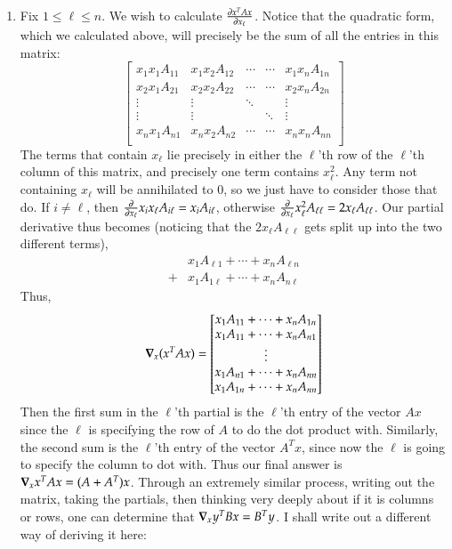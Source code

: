 \documentclass[12pt]{article}
\theoremstyle{definitionstyle}
\begin{document}
\begin{enumerate}[leftmargin=\labelsep]
\begin{enumerate}
			\item Fix $1 \leq \ell \leq n$. We wish to calculate $\pdv{x^TAx}{x_\ell}$. Notice that the quadratic form, which we calculated above, will precisely be the sum of all the entries in this matrix:
			\[
			\begin{bmatrix} 
				x_{1}x_1A_{11} & x_1x_2A_{12} & \cdots & \cdots & x_1x_nA_{1n} \\
				x_2x_1A_{21} & x_2x_2A_{22} & \cdots & \cdots & x_2x_nA_{2n} \\
				\vdots & \vdots & \ddots & & \vdots \\
				\vdots & \vdots & & \ddots & \vdots \\
				x_nx_1A_{n1} & x_nx_2A_{n2} & \cdots & \cdots & x_nx_nA_{nn} \\
			\end{bmatrix}\]
			The terms that contain $x_\ell$ lie precisely in either the $\ell$'th row of the $\ell$'th column of this matrix, and precisely one term contains $x_\ell^2$. Any term not containing $x_\ell$ will be annihilated to 0, so we just have to consider those that do. If $i \neq \ell$, then $\pdv{x_\ell} x_ix_\ell A_{i\ell} = x_iA_{i\ell}$, otherwise $\pdv{x_\ell} x_\ell^2A_{\ell\ell} = 2x_\ell A_{\ell \ell}$. Our partial derivative thus becomes (noticing that the $2x_\ell A_{\ell\ell}$ gets split up into the two different terms),
			\begin{align*}
				& x_1 A_{\ell 1} + \cdots +  x_n A_{\ell n} \\
				+&x_1A_{1 \ell} + \cdots + x_n A_{n \ell}
			\end{align*}
			Thus,
			\begin{align*}
				\grad_x(x^TAx) = \begin{bmatrix}
					 x_1 A_{1 1} + \cdots +  x_n A_{1 n} \\
					x_1A_{1 1} + \cdots + x_n A_{n 1} \\
					\vdots \\
					 x_1 A_{n 1} + \cdots +  x_n A_{n n} \\
					x_1A_{1 n} + \cdots + x_n A_{n n} \\
				\end{bmatrix}
			\end{align*}
		Then the first sum in the $\ell$'th partial is the $\ell$'th entry of the vector $Ax$ since the $\ell$ is specifying the row of $A$ to do the dot product with. Similarly, the second sum is the $\ell$'th entry of the vector $A^Tx$, since now the $\ell$ is going to specify the column to dot with. Thus our final answer is $\grad_x x^TAx = (A+A^T)x$. Through an extremely similar process, writing out the matrix, taking the partials, then thinking very deeply about if it is columns or rows, one can determine that $\grad_x y^TBx = B^Ty$. I shall write out a different way of deriving it here:
		

\end{enumerate}
\end{enumerate}
\end{document}
